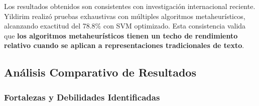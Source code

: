 Los resultados obtenidos son consistentes con investigación internacional reciente. Yildirim \cite{yildirim2023novel} realizó pruebas exhaustivas con múltiples algoritmos metaheurísticos, alcanzando exactitud del 78.8\% con SVM optimizado. Esta consistencia valida que \textbf{los algoritmos metaheurísticos tienen un techo de rendimiento relativo cuando se aplican a representaciones tradicionales de texto}.

\subsection{Análisis Comparativo de Resultados}
\label{subsec:analisis_comparativo}

\begin{table}[htbp]
\centering
{}
\caption{Resultados comparativos finales de los cinco algoritmos metaheurísticos implementados usando métricas macro promedio.}
\label{tab:resultados_comparativos_final}
\end{table}

\subsubsection{Fortalezas y Debilidades Identificadas}

